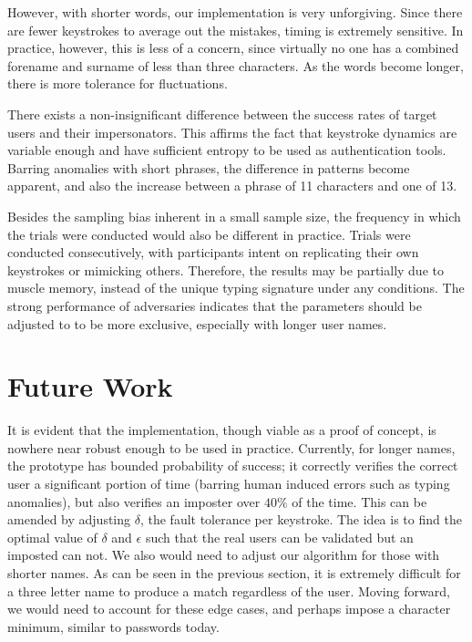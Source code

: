 \documentclass[11pt]{article}
\begin{document}
However, with shorter words, our implementation is very unforgiving.  Since there are fewer keystrokes to average out the mistakes, timing is extremely sensitive.  In practice, however, this is less of a concern, since virtually no one has a combined forename and surname of less than three characters.   As the words become longer, there is more tolerance for fluctuations.

There exists a non-insignificant difference between the success rates of target users and their impersonators.  This affirms the fact that keystroke dynamics are variable enough and have sufficient entropy to be used as authentication tools.  Barring anomalies with short phrases, the difference in patterns become apparent, and also the increase between a phrase of 11 characters and one of 13. 

Besides the sampling bias inherent in a small sample size, the frequency in which the trials were conducted would also be different in practice. Trials were conducted consecutively, with participants intent on replicating their own keystrokes or mimicking others.  Therefore, the results may be partially due to muscle memory, instead of the unique typing signature under any conditions.  The strong performance of adversaries indicates that the parameters should be adjusted to to be more exclusive, especially with longer user names.

\section{Future Work}
\label{sec:future}
It is evident that the implementation, though viable as a proof of concept, is nowhere near robust enough to be used in practice.  Currently, for longer names, the prototype has bounded probability of success; it correctly verifies the correct user a significant portion of time (barring human induced errors such as typing anomalies), but also verifies an imposter over $40\%$ of the time.  This can be amended by adjusting $\delta$, the fault tolerance per keystroke.  The idea is to find the optimal value of $\delta$ and $\epsilon$ such that the real users can be validated but an imposted can not.  We also would need to adjust our algorithm for those with shorter names.  As can be seen in the previous section, it is extremely difficult for a three letter name to produce a match regardless of the user.  Moving forward, we would need to account for these edge cases, and perhaps impose a character minimum, similar to passwords today.
\end{document}
